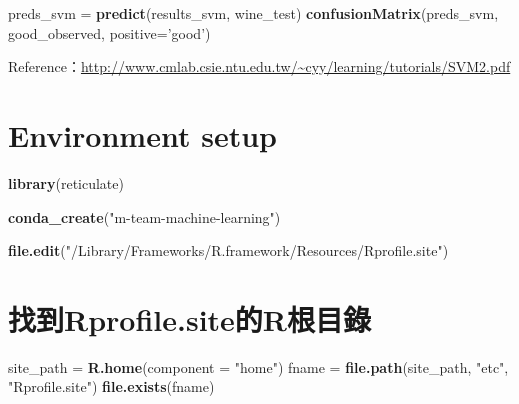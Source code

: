 \documentclass[]{book}
\newenvironment{Shaded}{\begin{snugshade}}{\end{snugshade}}
\newcommand{\KeywordTok}[1]{\textcolor[rgb]{0.13,0.29,0.53}{\textbf{#1}}}
\newcommand{\DataTypeTok}[1]{\textcolor[rgb]{0.13,0.29,0.53}{#1}}
\newcommand{\StringTok}[1]{\textcolor[rgb]{0.31,0.60,0.02}{#1}}
\newcommand{\NormalTok}[1]{#1}
\begin{document}
\begin{Shaded}
\begin{Highlighting}[]
\NormalTok{preds_svm =}\StringTok{ }\KeywordTok{predict}\NormalTok{(results_svm, wine_test)}
\KeywordTok{confusionMatrix}\NormalTok{(preds_svm, good_observed, }\DataTypeTok{positive=}\StringTok{'good'}\NormalTok{)}
\end{Highlighting}
\end{Shaded}

Reference：\url{http://www.cmlab.csie.ntu.edu.tw/~cyy/learning/tutorials/SVM2.pdf}

\hypertarget{environment-setup}{%
\section{Environment setup}\label{environment-setup}}

\begin{Shaded}
\begin{Highlighting}[]
\KeywordTok{library}\NormalTok{(reticulate)}
\end{Highlighting}
\end{Shaded}

\begin{Shaded}
\begin{Highlighting}[]
\KeywordTok{conda_create}\NormalTok{(}\StringTok{"m-team-machine-learning"}\NormalTok{)}
\end{Highlighting}
\end{Shaded}

\begin{Shaded}
\begin{Highlighting}[]
\KeywordTok{file.edit}\NormalTok{(}\StringTok{"/Library/Frameworks/R.framework/Resources/Rprofile.site"}\NormalTok{)}
\end{Highlighting}
\end{Shaded}

\hypertarget{rprofile.siter}{%
\section{找到Rprofile.site的R根目錄}\label{rprofile.siter}}

\begin{Shaded}
\begin{Highlighting}[]
\NormalTok{site_path =}\StringTok{ }\KeywordTok{R.home}\NormalTok{(}\DataTypeTok{component =} \StringTok{"home"}\NormalTok{)}
\NormalTok{fname =}\StringTok{ }\KeywordTok{file.path}\NormalTok{(site_path, }\StringTok{"etc"}\NormalTok{, }\StringTok{"Rprofile.site"}\NormalTok{)}
\KeywordTok{file.exists}\NormalTok{(fname)}
\end{Highlighting}
\end{Shaded}
\end{document}
